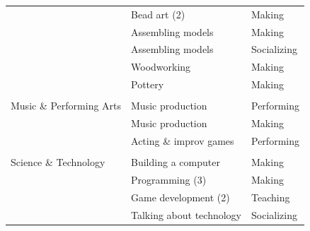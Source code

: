 \begin{table}[b!]
\begin{tabular}{lll}
                         & Bead art (2)                                    & Making                                                                    \\
                         & Assembling models                               & Making                                                                    \\
                         & Assembling models                               & Socializing                                                               \\
                         & Woodworking                                     & Making                                                                    \\
                         & Pottery                                         & Making                                                                    \\
                         &                                                 &                                                                           \\
Music \& Performing Arts & Music production                                & Performing                                                                \\
                         & Music production                                & Making                                                                    \\
                         & Acting \& improv games                          & Performing                                                                \\
                         &                                                 &                                                                           \\
Science \& Technology    & Building a computer                             & Making                                                                    \\
                         & Programming (3)                                 & Making                                                                    \\
                         & Game development (2)                            & Teaching                                                                  \\
                         & Talking about technology                        & Socializing                                                              
\end{tabular}
\end{table}

